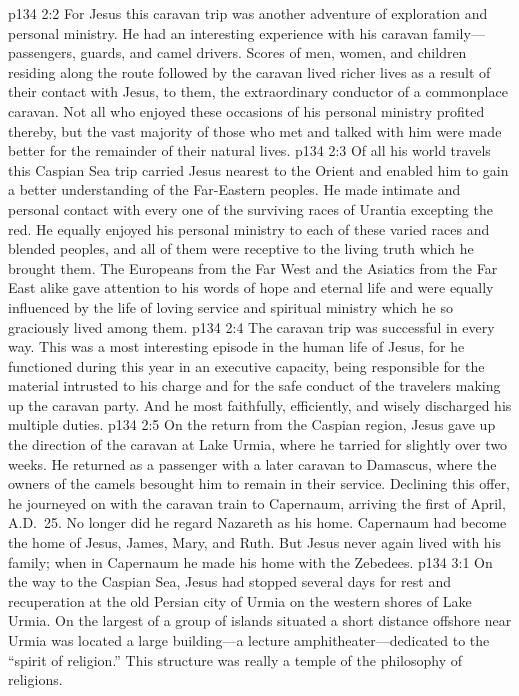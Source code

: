 \vs p134 2:2 For Jesus this caravan trip was another adventure of exploration and personal ministry. He had an interesting experience with his caravan family---passengers, guards, and camel drivers. Scores of men, women, and children residing along the route followed by the caravan lived richer lives as a result of their contact with Jesus, to them, the extraordinary conductor of a commonplace caravan. Not all who enjoyed these occasions of his personal ministry profited thereby, but the vast majority of those who met and talked with him were made better for the remainder of their natural lives.
\vs p134 2:3 Of all his world travels this Caspian Sea trip carried Jesus nearest to the Orient and enabled him to gain a better understanding of the Far\hyp{}Eastern peoples. He made intimate and personal contact with every one of the surviving races of Urantia excepting the red. He equally enjoyed his personal ministry to each of these varied races and blended peoples, and all of them were receptive to the living truth which he brought them. The Europeans from the Far West and the Asiatics from the Far East alike gave attention to his words of hope and eternal life and were equally influenced by the life of loving service and spiritual ministry which he so graciously lived among them.
\pc \vs p134 2:4 The caravan trip was successful in every way. This was a most interesting episode in the human life of Jesus, for he functioned during this year in an executive capacity, being responsible for the material intrusted to his charge and for the safe conduct of the travelers making up the caravan party. And he most faithfully, efficiently, and wisely discharged his multiple duties.
\vs p134 2:5 On the return from the Caspian region, Jesus gave up the direction of the caravan at Lake Urmia, where he tarried for slightly over two weeks. He returned as a passenger with a later caravan to Damascus, where the owners of the camels besought him to remain in their service. Declining this offer, he journeyed on with the caravan train to Capernaum, arriving the first of April, A.D.~25. No longer did he regard Nazareth as his home. Capernaum had become the home of Jesus, James, Mary, and Ruth. But Jesus never again lived with his family; when in Capernaum he made his home with the Zebedees.
\vs p134 3:1 On the way to the Caspian Sea, Jesus had stopped several days for rest and recuperation at the old Persian city of Urmia on the western shores of Lake Urmia. On the largest of a group of islands situated a short distance offshore near Urmia was located a large building---a lecture amphitheater---dedicated to the “spirit of religion.” This structure was really a temple of the philosophy of religions.
